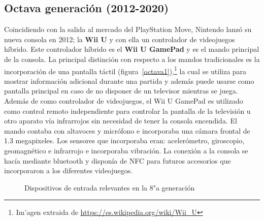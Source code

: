
\subsection{Octava generaci\'on (2012-2020)}

Coincidiendo con la salida al mercado del PlayStation Move, Nintendo lanz\'o su nueva consola en 2012; la \textbf{Wii U} y con ella un controlador de videojuegos h\'ibrido. Este controlador h\'ibrido es el \textbf{Wii U GamePad} y es el mando principal de la consola. La principal distinci\'on con respecto a los mandos tradicionales es la incorporaci\'on de una pantalla t\'actil (figura~\ref{octava1}),\footnote{Im'agen extraida de \url{https://es.wikipedia.org/wiki/Wii_U}} la cual se utiliza para mostrar informaci\'on adicional durante una partida y adem\'as puede usarse como pantalla principal en caso de no disponer de un televisor mientras se juega. Adem\'as de como controlador de videojuegos, el Wii U GamePad es utilizado como control remoto independiente para controlar la pantalla de la televisi\'on u otro aparato v\'ia infrarrojos sin necesidad de tener la consola encendida. El mando contaba con altavoces y micr\'ofono e incorporaba una c\'amara frontal de 1.3 megapixeles. Los sensores que incorporaba eran: aceler\'ometro, giroscopio, geomagn\'etico e infrarrojo e incorporaba vibraci\'on. La conexi\'on a la consola se hac\'ia mediante bluetooth  y dispon\'ia de NFC para futuros accesorios que incorporaron a los diferentes videojuegos.\\

\begin{figure}[t]
     \hfill
{}
\hfill
{}
     \caption{Dispositivos de entrada relevantes en la 8"a  generaci\'on}
     \label{fig:octava}
   \end{figure}

